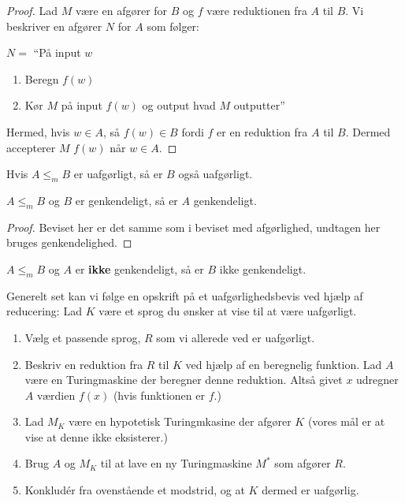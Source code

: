 \begin{proof}
	Lad $M$ være en afgører for $B$ og $f$ være reduktionen fra $A$ til $B$. Vi beskriver en afgører $N$ for $A$ som følger:

	$N = $ ``På input $w$
	\begin{enumerate}
		\item Beregn $f(w)$
		\item Kør $M$ på input $f(w)$ og output hvad $M$ outputter''
	\end{enumerate}

	Hermed, hvis $w \in A$, så $f(w) \in B$ fordi $f$ er en reduktion fra $A$ til $B$. Dermed accepterer $M$ $f(w)$ når $w \in A$.
\end{proof}

\begin{corollary}
	Hvis $A \leq _{m}B$ er uafgørligt, så er $B$ også uafgørligt.
\end{corollary}

\begin{theorem}
	$A \leq_{m} B$ og $B$ er genkendeligt, så er $A$ genkendeligt.
\end{theorem}

\begin{proof}
	Beviset her er det samme som i beviset med afgørlighed, undtagen her bruges genkendelighed.
\end{proof}

\begin{corollary}
	$A \leq_m B$ og $A$ er \textbf{ikke} genkendeligt, så er $B$ ikke genkendeligt.
\end{corollary}


Generelt set kan vi følge en opskrift på et uafgørlighedsbevis ved hjælp af reducering:
Lad $K$ være et sprog du ønsker at vise til at være uafgørligt.
\begin{enumerate}

	\item Vælg et passende sprog, $R$ som vi allerede ved er uafgørligt.
	\item Beskriv en reduktion fra $R$ til $K$ ved hjælp af en beregnelig funktion. Lad $A$ være en Turingmaskine der beregner denne reduktion. Altså givet $x$ udregner $A$ værdien $f(x)$ (hvis funktionen er $f$.)
	\item Lad $M_{K}$ være en hypotetisk Turingmkasine der afgører $K$ (vores mål er at vise at denne ikke eksisterer.)
	\item Brug $A$ og $M_{K}$ til at lave en ny Turingmaskine $M^{*}$ som afgører $R$.
	\item Konkludér fra ovenstående et modstrid, og at $K$ dermed er uafgørlig.
\end{enumerate}



